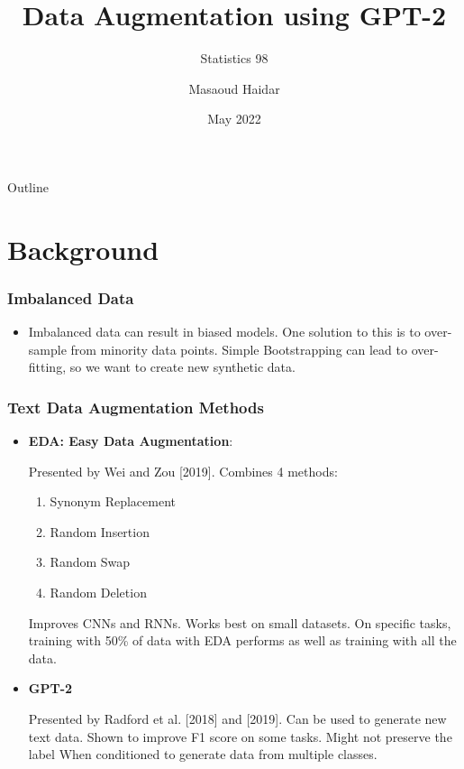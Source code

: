 \documentclass{beamer}
\title{Data Augmentation using GPT-2}
\author{Masaoud Haidar}
\subtitle{Statistics 98}
\institute{Harvard University}
\date{May 2022}
\begin{document}
\begin{frame}
    \titlepage
\end{frame}

\begin{frame}{Outline}
    \tableofcontents
\end{frame}







\section{Background}
\begin{frame}
\frametitle{Imbalanced Data}

\begin{itemize}
\item Imbalanced data can result in biased models. One solution to this is to over-sample from minority data points. Simple Bootstrapping can lead to over-fitting, so we want to create new synthetic data. 
\end{itemize}

\end{frame}

\begin{frame}
\frametitle{Text Data Augmentation Methods}

\begin{itemize}
\item \textbf{EDA: Easy Data Augmentation}: 

Presented by Wei and Zou [2019]. Combines 4 methods:

\begin{enumerate}
    \item Synonym Replacement
    \item Random Insertion
    \item Random Swap
    \item Random Deletion
\end{enumerate}

Improves CNNs and RNNs. Works best on small datasets. On specific tasks, training with 50\% of data with EDA performs as well as training with all the data. 

\textbf{}

\item<2-> \textbf{GPT-2}

Presented by Radford et al. [2018] and [2019]. Can be used to generate new text data. Shown to improve F1 score on some tasks. Might not preserve the label When conditioned to generate data from multiple classes.

\end{itemize}

\end{frame}
\end{document}
